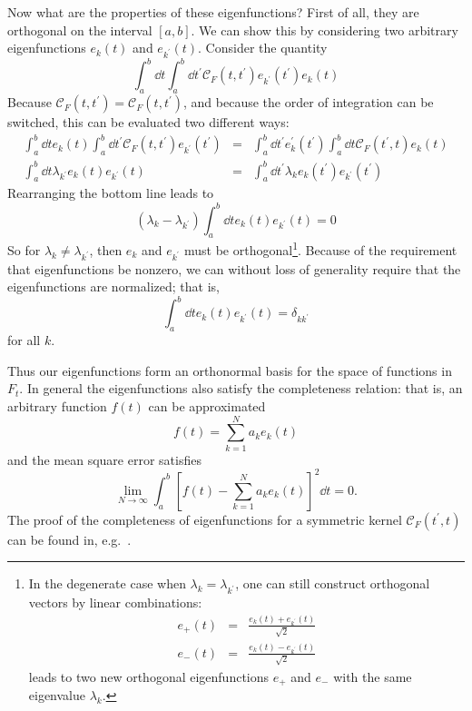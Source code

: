 Now what are the properties of these eigenfunctions?  First of all, they
are orthogonal on the interval $[a, b]$.
We can show this by considering two arbitrary eigenfunctions
$e_k(t)$ and $e_{k^\prime}(t)$.  Consider the quantity
\begin{equation}
  \int_a^b \dd t \int_a^b \dd t^\prime \mathcal{C}_F(t, t^\prime)
  e_{k^\prime}(t^\prime) e_k(t)
\end{equation}
Because $\mathcal{C}_F(t, t^\prime) = \mathcal{C}_F(t, t^\prime)$, and
because the order of integration can be switched, this can be evaluated
two different ways:
\begin{eqnarray}
  \int_a^b \dd t e_k(t)
  \int_a^b \dd t^\prime \mathcal{C}_F(t, t^\prime) e_{k^\prime}(t^\prime) &=&
  \int_a^b \dd t^\prime e_k^\prime(t^\prime)
  \int_a^b \dd t \mathcal{C}_F(t^\prime, t) e_{k}(t)
  \nonumber\\
  \int_a^b \dd t \lambda_{k^\prime} e_k(t) e_{k^\prime}(t) &=&
  \int_a^b \dd t^\prime \lambda_k e_k(t^\prime) e_{k^\prime}(t^\prime)
\end{eqnarray}
Rearranging the bottom line leads to
\begin{equation}
  (\lambda_k - \lambda_{k^\prime})
  \int_a^b \dd t e_k(t) e_{k^\prime}(t) = 0
\end{equation}
So for $\lambda_k \ne \lambda_{k^\prime}$, then $e_k$ and $e_{k^\prime}$
must be orthogonal\footnote{In the degenerate case when
$\lambda_k = \lambda_{k^\prime}$, one can still construct orthogonal
vectors by linear combinations:
\begin{eqnarray}
  e_+(t) &=& \frac{e_k(t) + e_{k^\prime}(t)}{\sqrt{2}} \nonumber\\
  e_-(t) &=& \frac{e_k(t) - e_{k^\prime}(t)}{\sqrt{2}} \nonumber
\end{eqnarray}
leads to two new orthogonal eigenfunctions $e_+$ and $e_-$ with the
same eigenvalue $\lambda_k$.}.  Because of the
requirement that eigenfunctions be nonzero, we can without
loss of generality require that the eigenfunctions are normalized; that is,
\begin{equation}
  \int_a^b \dd t e_k(t) e_{k^\prime}(t) = \delta_{kk^\prime}
\end{equation}
for all $k$.

Thus our eigenfunctions form an orthonormal basis for 
the space of functions in $F_t$.  In general the eigenfunctions
also satisfy the completeness relation: that is, 
an arbitrary function $f(t)$ can be approximated
\begin{equation}
  f(t) = \sum_{k=1}^N a_k e_k(t)
\end{equation}
and the mean square error satisfies
\begin{equation}
  \lim_{N\to\infty} \int_a^b
  \left[f(t) - \sum_{k=1}^{N}a_k e_k(t)\right]^2 \dd t = 0.
\end{equation}
The proof of the completeness of eigenfunctions for a symmetric kernel
$\mathcal{C}_F(t^\prime, t)$ can be found in, e.g.~\citet{Courant1989}.

